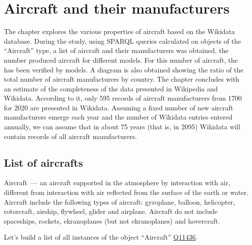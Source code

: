 \setchapterpreamble[u]{\margintoc}
\chapter{Aircraft and their manufacturers\protect\footnotemark}


The chapter explores the various properties of aircraft based on the Wikidata database.
During the study, using SPARQL queries calculated on objects of the ``Aircraft'' type, a list of aircraft and their manufacturers was obtained, the number 
produced aircraft for different models. For this number of aircraft, the  has been verified by models.
A diagram is also obtained showing the ratio of the total number of aircraft manufacturers by country.
The chapter concludes with an estimate of the completeness of the data presented in Wikipedia and Wikidata. 
According to it, only 595 records of aircraft manufacturers from \num{1700} for 2020 are presented in Wikidata.
Assuming a fixed number of new aircraft manufacturers emerge each year and the number of Wikidata entries entered annually, 
we can assume that in about 75 years (that is, in 2095) Wikidata will contain records of all aircraft manufacturers.



\section{List of aircrafts}

Aircraft~--- an aircraft supported in the atmosphere by interaction with air, different from interaction with air reflected from the 
surface of the earth or water.
Aircraft include the following types of aircraft: gyroplane, balloon, helicopter, rotorcraft, airship, flywheel, glider and airplane.
Aircraft do not include spaceships, rockets, ekranoplanes (but not ekranoplanes) and hovercraft.

Let's build a list of all instances of the object ``Aircraft'' \href{https://www.wikidata.org/wiki/Q11436}{Q11436}.

